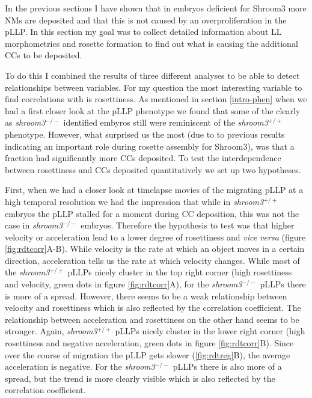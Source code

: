 \documentclass[10pt, b5paper, singlespacinge, twoside]{reedthesis} %
\theoremstyle{definition}
\theoremstyle{definition}
\theoremstyle{definition}
\theoremstyle{remark}
\begin{document}
In the previous sections I have shown that in embryos deficient for Shroom3 more NMs are deposited and that this is not caused by an overproliferation in the pLLP. In this section my goal was to collect detailed information about LL morphometrics and rosette formation to find out what is causing the additional CCs to be deposited.

To do this I combined the results of three different analyses to be able to detect relationships between variables. For my question the most interesting variable to find correlations with is rosettiness. As mentioned in section \ref{intro-phen} when we had a first closer look at the pLLP phenotype we found that some of the clearly as \emph{shroom3}\(^{-/-}\) identified embyros still were reminiscent of the \emph{shroom3}\(^{+/+}\) phenotype. However, what surprised us the most (due to to previous results indicating an important role during rosette assembly for Shroom3), was that a fraction had significantly more CCs deposited. To test the interdependence between rosettiness and CCs deposited quantitatively we set up two hypotheses.

First, when we had a closer look at timelapse movies of the migrating pLLP at a high temporal resolution we had the impression that while in \emph{shroom3}\(^{+/+}\) embryos the pLLP stalled for a moment during CC deposition, this was not the case in \emph{shroom3}\(^{-/-}\) embryos. Therefore the hypothesis to test was that higher velocity or acceleration lead to a lower degree of rosettiness and \emph{vice versa} (figure \ref{fig:rdtcorr}A-B). While velocity is the rate at which an object moves in a certain direction, acceleration tells us the rate at which velocity changes. While most of the \emph{shroom3}\(^{+/+}\) pLLPs nicely cluster in the top right corner (high rosettiness and velocity, green dots in figure \ref{fig:rdtcorr}A), for the \emph{shroom3}\(^{-/-}\) pLLPs there is more of a spread. However, there seems to be a weak relationship between velocity and rosettiness which is also reflected by the correlation coefficient. The relationship between acceleration and rosettiness on the other hand seems to be stronger. Again, \emph{shroom3}\(^{+/+}\) pLLPs nicely cluster in the lower right corner (high rosettiness and negative acceleration, green dots in figure \ref{fig:rdtcorr}B). Since over the course of migration the pLLP gets slower (\ref{fig:rdtreg}B), the average acceleration is negative. For the \emph{shroom3}\(^{-/-}\) pLLPs there is also more of a spread, but the trend is more clearly visible which is also reflected by the correlation coefficient.
\end{document}
